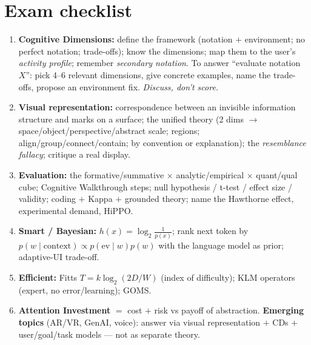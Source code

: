 \documentclass[11pt,a4paper]{article}
\begin{document}
\section*{Exam checklist}

\begin{must}
\begin{enumerate}[leftmargin=*,itemsep=2pt]
  \item \textbf{Cognitive Dimensions:} define the framework (notation $+$ environment; no perfect notation; trade-offs); know the dimensions; map them to the user's \emph{activity profile}; remember \emph{secondary notation}. To answer ``evaluate notation $X$'': pick 4--6 relevant dimensions, give concrete examples, name the trade-offs, propose an environment fix. \emph{Discuss, don't score.}
  \item \textbf{Visual representation:} correspondence between an invisible information structure and marks on a surface; the unified theory (2 dims $\to$ space/object/perspective/abstract scale; regions; align/group/connect/contain; by convention or explanation); the \emph{resemblance fallacy}; critique a real display.
  \item \textbf{Evaluation:} the formative/summative $\times$ analytic/empirical $\times$ quant/qual cube; Cognitive Walkthrough steps; null hypothesis / t-test / effect size / validity; coding $+$ Kappa $+$ grounded theory; name the Hawthorne effect, experimental demand, HiPPO.
  \item \textbf{Smart / Bayesian:} $h(x)=\log_2\frac1{p(x)}$; rank next token by $p(w\mid\text{context})\propto p(\text{ev}\mid w)p(w)$ with the language model as prior; adaptive-UI trade-off.
  \item \textbf{Efficient:} Fitts $T=k\log_2(2D/W)$ (index of difficulty); KLM operators (expert, no error/learning); GOMS.
  \item \textbf{Attention Investment} $=$ cost $+$ risk vs payoff of abstraction. \textbf{Emerging topics} (AR/VR, GenAI, voice): answer via visual representation $+$ CDs $+$ user/goal/task models --- not as separate theory.
\end{enumerate}
\end{must}
\end{document}
